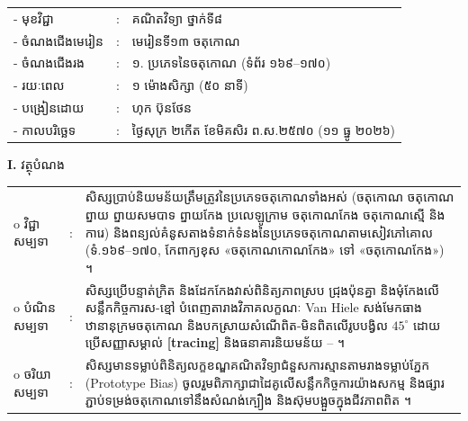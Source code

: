 \documentclass[a4paper,10pt]{article}
\newcommand{\wcirc}{{\CourierBullet\fontsize{9.5pt}{11pt}\selectfont o}}
\newcommand{\en}[1]{{\TimesEn #1}}
\newcommand{\cnum}[1]{{\fontsize{10.5pt}{12pt}\selectfont\ding{\numexpr171+#1\relax}}\hspace{0.2em}}
\begin{document}
{\renewcommand{\arraystretch}{0.95}
\hspace*{4.05cm}%
\begin{tabular}{@{}l l l@{}}
  - \hspace{0.35cm} មុខវិជ្ជា & : & គណិតវិទ្យា ថ្នាក់ទី៨ \\
  - \hspace{0.35cm} ចំណងជើងមេរៀន & : & មេរៀនទី១៣ ចតុកោណ \\
  - \hspace{0.35cm} ចំណងជើងរង & : & ១. ប្រភេទនៃចតុកោណ (ទំព័រ ១៦៩--១៧០) \\
  - \hspace{0.35cm} រយៈពេល & : & ១ ម៉ោងសិក្សា (៥០ នាទី) \\
  - \hspace{0.35cm} បង្រៀនដោយ & : & ហុក ប៊ុនថែន \\
  - \hspace{0.35cm} កាលបរិច្ឆេទ & : & ថ្ងៃសុក្រ ២កើត ខែមិគសិរ ព.ស.២៥៧០ (១១ ធ្នូ ២០២៦) \\
\end{tabular}

\vspace{1pt}

\textbf{I.} {\muol វត្ថុបំណង}\\[1pt]
\hspace*{0.55cm}%
\begin{tabular}{@{}l l L{14.2cm}@{}}
  \wcirc \hspace{0.25cm} វិជ្ជាសម្បទា & : & សិស្សប្រាប់និយមន័យត្រឹមត្រូវនៃប្រភេទចតុកោណទាំងអស់ (ចតុកោណ ចតុកោណព្នាយ ព្នាយសមបាទ ព្នាយកែង ប្រលេឡូក្រាម ចតុកោណកែង ចតុកោណស្មើ និងការេ) និងពន្យល់គំនូសតាងទំនាក់ទំនងនៃប្រភេទចតុកោណតាមសៀវភៅគោល (ទំ.១៦៩--១៧០, កែពាក្យខុស «ចតុកោណកោណកែង» ទៅ «ចតុកោណកែង») ។ \\
  \wcirc \hspace{0.25cm} បំណិនសម្បទា & : & សិស្សប្រើបន្ទាត់ក្រិត និងដែកកែងវាស់ពិនិត្យភាពស្រប ជ្រុងប៉ុនគ្នា និងមុំកែងលើសន្លឹកកិច្ចការស-ខ្មៅ បំពេញតារាងវិភាគលក្ខណៈ \en{Van Hiele} សង់មែកធាងឋានានុក្រមចតុកោណ និងបកស្រាយសំណើពិត-មិនពិតលើរូបបង្វិល $45^\circ$ ដោយប្រើសញ្ញាសម្គាល់ \textbf{[tracing]} និងធនាគារនិយមន័យ \cnum{1}--\cnum{5} ។ \\
  \wcirc \hspace{0.25cm} ចរិយាសម្បទា & : & សិស្សមានទម្លាប់ពិនិត្យលក្ខខណ្ឌគណិតវិទ្យាជំនួសការស្មានតាមរាងទម្លាប់ភ្នែក (\en{Prototype Bias}) ចូលរួមពិភាក្សាជាដៃគូលើសន្លឹកកិច្ចការយ៉ាងសកម្ម និងផ្សារភ្ជាប់ទម្រង់ចតុកោណទៅនឹងសំណង់ក្បឿង និងស៊ុមបង្អួចក្នុងជីវភាពពិត ។ \\
\end{tabular}

}
\end{document}
